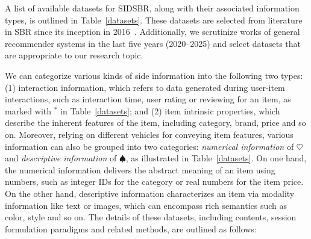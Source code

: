 \documentclass[lettersize,journal]{IEEEtran}
\newcommand{\baby}{{SIDSBR}\xspace}
\begin{document}
A list of available datasets for \baby, along with their associated information types, is outlined in Table~\ref{datasets}. These datasets are selected from literature in SBR since its inception in 2016~\cite{GRU4Rec}. Additionally, we scrutinize works of general recommender systems in the last five years (2020--2025) and select datasets that are appropriate to our research topic. 

We can categorize various kinds of side information into the following two types: (1) interaction information, which refers to data generated during user-item interactions, such as interaction time, user rating or reviewing for an item, as marked with $^*$ in Table~\ref{datasets}; and (2) item intrinsic properties, which describe the inherent features of the item, including category, brand, price and so on.
Moreover, relying on different vehicles for conveying item features, various information can also be grouped into two categories: \textit{numerical information} of $\heartsuit$ and \textit{descriptive information} of $\spadesuit$, as illustrated in Table~\ref{datasets}. On one hand, the numerical information delivers the abstract meaning of an item using numbers, such as integer IDs for the category or real numbers for the item price. On the other hand, descriptive information characterizes an item via modality information like text or images, which can encompass rich semantics such as color, style and so on.
The details of these datasets, including contents, session formulation paradigms and related methods, are outlined as follows:
\end{document}
